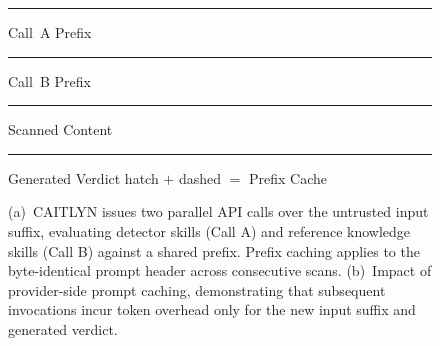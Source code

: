 \begin{figure}[!t]
\begin{minipage}{0.96\textwidth}
\vspace{2pt}
{\sffamily\scriptsize\color{FigMute}
\textcolor{HoldInk}{\rule{6pt}{6pt}} Call~A Prefix \quad
\textcolor{RecInk}{\rule{6pt}{6pt}} Call~B Prefix \quad
\textcolor{FailInk}{\rule{6pt}{6pt}} Scanned Content \quad
\textcolor{PassInk}{\rule{6pt}{6pt}} Generated Verdict \quad
hatch $+$ dashed $=$ Prefix Cache}
\end{minipage}

\caption{
  (a)~CAITLYN issues two parallel API calls over the
  untrusted input suffix, evaluating detector skills (Call A) and
  reference knowledge skills (Call B) against a shared prefix. Prefix
  caching applies to the byte-identical prompt header across
  consecutive scans. (b)~Impact of provider-side prompt caching,
  demonstrating that subsequent invocations incur token overhead
  only for the new input suffix and generated verdict.}

\label{fig:Tier1Prompt}
\end{figure}
